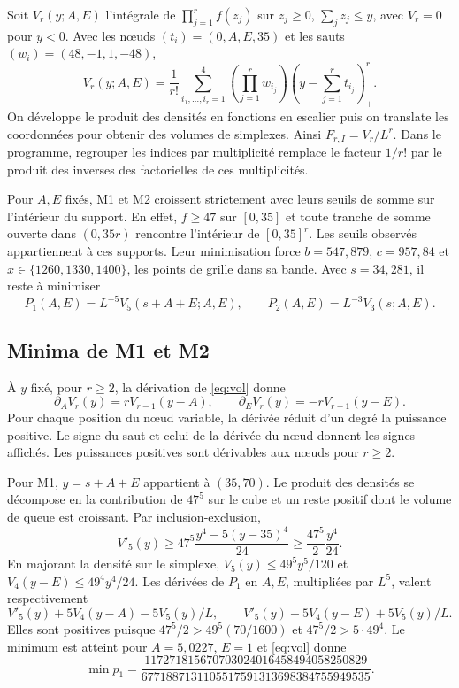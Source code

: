 \documentclass[11pt,a4paper]{article}
\begin{document}
Soit $V_r(y;A,E)$ l'intégrale de $\prod_{j=1}^r f(z_j)$ sur $z_j\geq0$, $\sum_j z_j\leq y$, avec $V_r=0$ pour $y<0$. Avec les n\oe{}uds $(t_i)=(0,A,E,35)$ et les sauts $(w_i)=(48,-1,1,-48)$,
\begin{equation}\label{eq:vol}
V_r(y;A,E)=\frac1{r!}\sum_{i_1,\ldots,i_r=1}^4
\left(\prod_{j=1}^r w_{i_j}\right)
\left(y-\sum_{j=1}^r t_{i_j}\right)_+^r.
\end{equation}
On développe le produit des densités en fonctions en escalier puis on translate les coordonnées pour obtenir des volumes de simplexes. Ainsi $F_{r,I}=V_r/L^r$. Dans le programme, regrouper les indices par multiplicité remplace le facteur $1/r!$ par le produit des inverses des factorielles de ces multiplicités.

Pour $A,E$ fixés, M1 et M2 croissent strictement avec leurs seuils de somme sur l'intérieur du support. En effet, $f\geq47$ sur $[0,35]$ et toute tranche de somme ouverte dans $(0,35r)$ rencontre l'intérieur de $[0,35]^r$. Les seuils observés appartiennent à ces supports. Leur minimisation force $b=547{,}879$, $c=957{,}84$ et $x\in\{1260,1330,1400\}$, les points de grille dans sa bande. Avec $s=34{,}281$, il reste à minimiser
\[
P_1(A,E)=L^{-5}V_5(s+A+E;A,E),\qquad
P_2(A,E)=L^{-3}V_3(s;A,E).
\]

\subsection{Minima de M1 et M2}

À $y$ fixé, pour $r\geq2$, la dérivation de \eqref{eq:vol} donne
\[
\partial_A V_r(y)=rV_{r-1}(y-A),\qquad
\partial_E V_r(y)=-rV_{r-1}(y-E).
\]
Pour chaque position du n\oe{}ud variable, la dérivée réduit d'un degré la puissance positive. Le signe du saut et celui de la dérivée du n\oe{}ud donnent les signes affichés. Les puissances positives sont dérivables aux n\oe{}uds pour $r\geq2$.

Pour M1, $y=s+A+E$ appartient à $(35,70)$. Le produit des densités se décompose en la contribution de $47^5$ sur le cube et un reste positif dont le volume de queue est croissant. Par inclusion-exclusion,
\[
V'_5(y)\geq47^5\frac{y^4-5(y-35)^4}{24}
\geq\frac{47^5}{2}\frac{y^4}{24}.
\]
En majorant la densité sur le simplexe, $V_5(y)\leq49^5y^5/120$ et $V_4(y-E)\leq49^4y^4/24$. Les dérivées de $P_1$ en $A,E$, multipliées par $L^5$, valent respectivement
\[
V'_5(y)+5V_4(y-A)-5V_5(y)/L,\qquad
V'_5(y)-5V_4(y-E)+5V_5(y)/L.
\]
Elles sont positives puisque $47^5/2>49^5(70/1600)$ et $47^5/2>5\cdot49^4$. Le minimum est atteint pour $A=5{,}0227$, $E=1$ et \eqref{eq:vol} donne
\[
\min p_1=\frac{117271815670703024016458494058250829}
{6771887131105517591313698384755949535}.
\]
\end{document}
